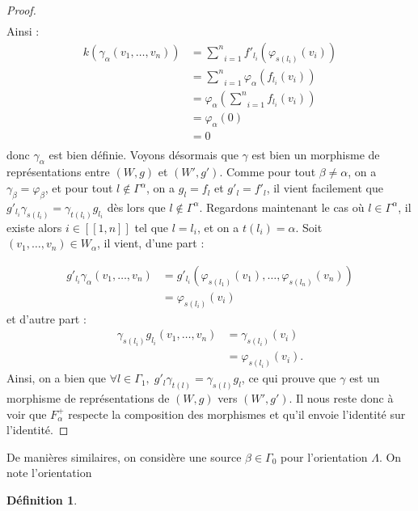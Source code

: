 \documentclass[a4paper,10pt]{article}
\newtheorem{defi}{Définition}[section]
\begin{document}
\begin{proof}
\[\begin{array}{lccc}
\end{array}
	\]
Ainsi :
\[
\begin{array}{rl}
	k(\gamma_{\alpha}(v_{1},\dots,v_{n})) & = \underset{i=1}{\overset{n}{\sum}}f'_{l_{i}}(\varphi_{s(l_{i})}(v_{i})) \\ 
	& = \underset{i=1}{\overset{n}{\sum}} \varphi_{\alpha}(f_{l_{i}}(v_{i}))\\
	& = \varphi_{\alpha}(\underset{i=1}{\overset{n}{\sum}}f_{l_{i}}(v_{i}))\\
	& = \varphi_{\alpha}(0) \\
	& = 0 \\
\end{array}
\]
donc $\gamma_{\alpha}$ est bien définie. Voyons désormais que $\gamma$ est bien un morphisme de représentations entre $(W,g)$ et $(W',g')$. Comme pour tout $\beta\neq\alpha$, on a $\gamma_{\beta}=\varphi_{\beta}$, et pour tout $l\notin\Gamma^{\alpha}$, on a $g_{l}=f_{l}$ et $g'_{l}=f'_{l}$, il vient facilement que $g'_{l_{i}}\gamma_{s(l_{i})}=\gamma_{t(l_{i})}g_{l_{i}}$ dès lors que $l\notin\Gamma^{\alpha}$. Regardons maintenant le cas où $l\in\Gamma^{\alpha}$, il existe alors $i\in[\![1,n]\!]$ tel que $l=l_{i}$, et on a $t(l_{i})=\alpha$. Soit $(v_{1},\dots,v_{n})\in W_{\alpha}$, il vient, d'une part :

\[
\begin{array}{ll}
	g'_{l_{i}}\gamma_{\alpha}(v_{1},\dots,v_{n})&=g'_{l_{i}}(\varphi_{s(l_{1})}(v_{1}),\dots,\varphi_{s(l_{n})}(v_{n}))\\
	&=\varphi_{s(l_{i})}(v_{i})
\end{array}
\]
et d'autre part :
\[
\begin{array}{ll}
	\gamma_{s(l_{i})}g_{l_{i}}(v_{1},\dots,v_{n})&=\gamma_{s(l_{i})}(v_{i})\\
	&=\varphi_{s(l_{i})}(v_{i}).
\end{array}
\]
Ainsi, on a bien que $\forall l \in\Gamma_{1},\;g'_{l}\gamma_{t(l)}=\gamma_{s(l)}g_{l}$, ce qui prouve que $\gamma$ est un morphisme de représentations de $(W,g)$ vers $(W',g')$. Il nous reste donc à voir que $F_{\alpha}^{+}$ respecte la composition des morphismes et qu'il envoie l'identité sur l'identité.


\end{proof}

De manières similaires, on considère une source $\beta \in \Gamma_0$ pour l'orientation $\Lambda$. On note  l'orientation  

\begin{defi}
  
\end{defi}
\clearpage


\end{document}
